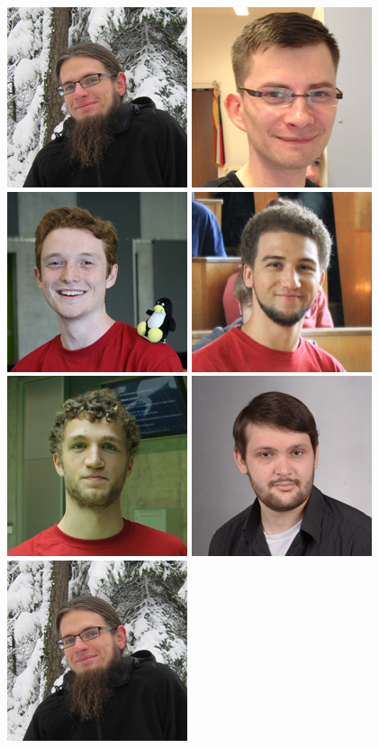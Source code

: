 \includegraphics[width=.2\linewidth]{img/fsr/200_jakob_kruse.jpg}
\includegraphics[width=.2\linewidth]{img/fsr/200_robin_trauer.jpg}
\includegraphics[width=.2\linewidth]{img/fsr/200_kilian_koeltzsch.jpg}
\includegraphics[width=.2\linewidth]{img/fsr/200_philipp_heisig.jpg}
\includegraphics[width=.2\linewidth]{img/fsr/200_simon_hanisch.jpg}
\includegraphics[width=.2\linewidth]{img/fsr/200_tim_hackel.jpg}
\includegraphics[width=.2\linewidth]{img/fsr/200_jakob_kruse.jpg}
